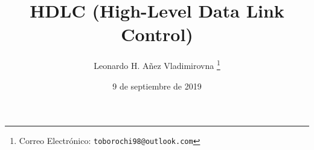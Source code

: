 

\title{HDLC (High-Level Data Link Control)}

\author{Leonardo H. Añez Vladimirovna%
  \thanks{Correo Electrónico: \texttt{toborochi98@outlook.com}}}
\date{9 de septiembre de 2019}

\maketitle




